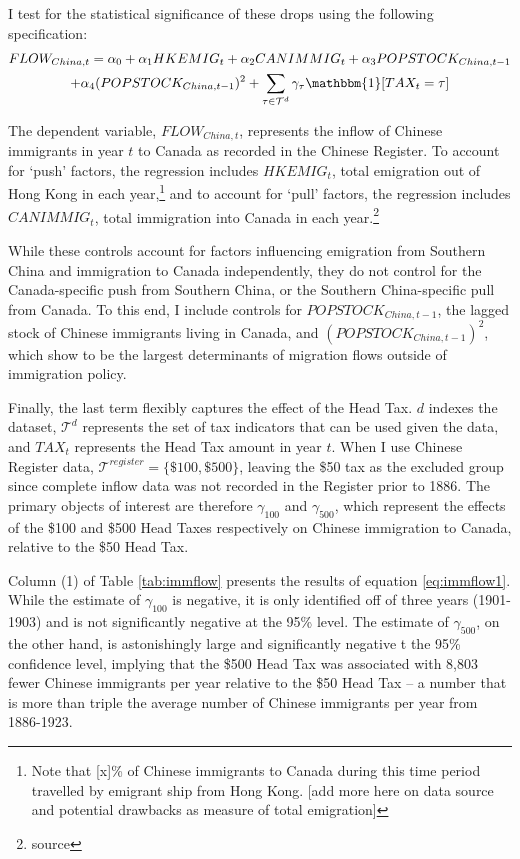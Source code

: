 I test for the statistical significance of these drops using the following specification: 
\begin{multline}
    \label{eq:immflow1}
    FLOW_{China,t} = \alpha_0 + \alpha_1 HKEMIG_t + \alpha_2 CANIMMIG_t + \alpha_3 POPSTOCK_{China, t-1} \\ + \alpha_4 (POPSTOCK_{China, t-1})^2 + \sum_{\tau \in \mathcal{T}^d} \gamma_\tau \mathbbm{1}[TAX_t = \tau]
\end{multline}

The dependent variable, $FLOW_{China,t}$, represents the inflow of Chinese immigrants in year $t$ to Canada as recorded in the Chinese Register. To account for `push' factors, the regression includes $HKEMIG_t$, total emigration out of Hong Kong in each year,\footnote{Note that [x]\% of Chinese immigrants to Canada during this time period travelled by emigrant ship from Hong Kong. [add more here on data source and potential drawbacks as measure of total emigration]} and to account for `pull' factors, the regression includes $CANIMMIG_t$, total immigration into Canada in each year.\footnote{source}

While these controls account for factors influencing emigration from Southern China and immigration to Canada independently, they do not control for the Canada-specific push from Southern China, or the Southern China-specific pull from Canada. To this end, I include controls for $POPSTOCK_{China,t-1}$, the lagged stock of Chinese immigrants living in Canada, and $(POPSTOCK_{China,t-1})^2$, which \citet{Clarketal2007} show to be the largest determinants of migration flows outside of immigration policy.

Finally, the last term flexibly captures the effect of the Head Tax. $d$ indexes the dataset, $\mathcal{T}^d$ represents the set of tax indicators that can be used given the data, and $TAX_t$ represents the Head Tax amount in year $t$. When I use Chinese Register data, $\mathcal{T}^{register} = \{\$100,\$500\}$, leaving the \$50 tax as the excluded group since complete inflow data was not recorded in the Register prior to 1886. The primary objects of interest are therefore $\gamma_{100}$ and $\gamma_{500}$, which represent the effects of the \$100 and \$500 Head Taxes respectively on Chinese immigration to Canada, relative to the \$50 Head Tax.

Column (1) of Table \ref{tab:immflow} presents the results of equation \ref{eq:immflow1}. While the estimate of $\gamma_{100}$ is negative, it is only identified off of three years (1901-1903) and is not significantly negative at the 95\% level. The estimate of $\gamma_{500}$, on the other hand, is astonishingly large and significantly negative t the 95\% confidence level, implying that the \$500 Head Tax was associated with 8,803 fewer Chinese immigrants per year relative to the \$50 Head Tax -- a number that is more than triple the average number of Chinese immigrants per year from 1886-1923.

